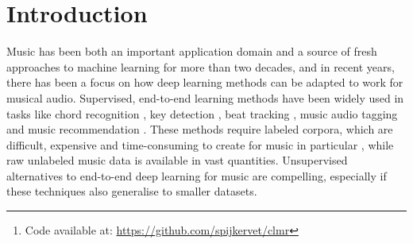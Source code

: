 \documentclass{article}
\begin{document}
\begin{abstract}
While supervised learning has enabled great advances in many areas of music, labeled music datasets remain especially hard, expensive and time-consuming to create.
In this work, we introduce SimCLR to the music domain and contribute a large chain of audio data augmentations, to form a simple framework for self-supervised learning of raw waveforms of music: \textit{CLMR}.
This approach requires no manual labeling and no preprocessing of music to learn useful representations.
We evaluate CLMR in the downstream task of music classification on the Magna\-Tag\-A\-Tune and Million Song datasets.
A \textit{linear} classifier fine-tuned on representations from a pre-trained CLMR model achieves an average precision of 35.4\% on the Magna\-Tag\-A\-Tune dataset, superseding fully supervised models that currently achieve a score of 34.9\%.
Moreover, we show that CLMR's representations are transferable using out-of-domain datasets, indicating that they capture important musical knowledge.
Lastly, we show that self-supervised pre-training allows us to learn efficiently on smaller labeled datasets: we still achieve a score of 33.1\% despite using only 259 labeled songs during fine-tuning.~\footnote{\label{code}Code available at: \href{https://github.com/spijkervet/CLMR}{https://github.com/spijkervet/clmr}}
\end{abstract} \section{Introduction}\label{sec:introduction}
Music has been both an important application domain and a source of fresh approaches to machine learning for more than two decades, and in recent years, there has been a focus on how deep learning methods can be adapted to work for musical audio.
Supervised, end-to-end learning methods have been widely used in tasks like chord recognition \cite{korzeniowski_fully_2016, chen_harmony_2019}, key detection \cite{korzeniowski_end--end_2017}, beat tracking \cite{bock_joint_2016}, music audio tagging \cite{pons_end--end_2017} and music recommendation \cite{van_den_oord_deep_2013}.
These methods require labeled corpora, which are difficult, expensive and time-consuming to create for music in particular \cite{doi:10.1080/09298215.2019.1613436}, while raw unlabeled music data is available in vast quantities.
Unsupervised alternatives to end-to-end deep learning for music are compelling, especially if these techniques also generalise to smaller datasets.
\end{document}
